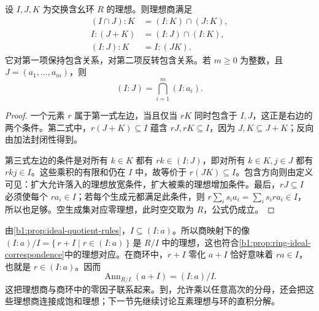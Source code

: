 \begin{proposition}\label{b1:prop:ideal-quotient-identities}
	设 \(I,J,K\) 为交换含幺环 \(R\) 的理想。则理想商满足
	\[
		\begin{aligned}
			(I\cap J):K&=(I:K)\cap(J:K),\\
			I:(J+K)&=(I:J)\cap(I:K),\\
			(I:J):K&=I:(JK).
		\end{aligned}
	\]
	它对第一项保持包含关系，对第二项反转包含关系。若 \(m\geq0\) 为整数，且 \(J=(a_1,\ldots,a_m)\)，则
	\[
		(I:J)=\bigcap_{i=1}^m(I:a_i).
	\]
\end{proposition}
\begin{proof}
	一个元素 \(r\) 属于第一式左边，当且仅当 \(rK\) 同时包含于 \(I,J\)，这正是右边的两个条件。第二式中，\(r(J+K)\subseteq I\) 蕴含 \(rJ,rK\subseteq I\)，因为 \(J,K\subseteq J+K\)；反向由加法封闭性得到。

	第三式左边的条件是对所有 \(k\in K\) 都有 \(rk\in(I:J)\)，即对所有 \(k\in K,j\in J\) 都有 \(rkj\in I\)。这些乘积的有限和仍在 \(I\) 中，故等价于 \(r(JK)\subseteq I\)。包含方向则由定义可见：扩大允许落入的理想放宽条件，扩大被乘的理想增加条件。最后，\(rJ\subseteq I\) 必须使每个 \(ra_i\in I\)；若每个生成元都满足此条件，则 \(r\sum_i s_i a_i=\sum_i s_i ra_i\in I\)，所以也足够。空生成集对应零理想，此时空交取为 \(R\)，公式仍成立。
\end{proof}
由\cref{b1:prop:ideal-quotient-rules}，\(I\subseteq(I:a)\)。所以商映射下的像 \((I:a)/I=\{\,r+I\mid r\in(I:a)\,\}\) 是 \(R/I\) 中的理想，这也符合\cref{b1:prop:ring-ideal-correspondence}中的理想对应。在商环中，\(r+I\) 零化 \(a+I\) 恰好意味着 \(ra\in I\)，也就是 \(r\in(I:a)\)。因而
\[
	\operatorname{Ann}_{R/I}(a+I)=(I:a)/I.
\]
这把理想商与商环中的零因子联系起来。到，允许乘以任意高次的分母，还会把这些理想商连接成饱和理想；下一节先继续讨论互素理想与环的直积分解。
